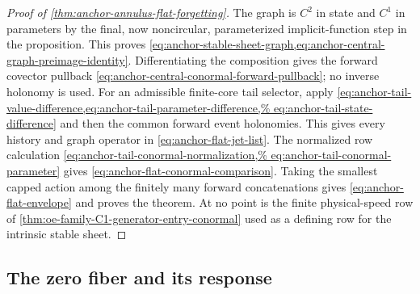 \begin{proof}[Proof of \cref{thm:anchor-annulus-flat-forgetting}]
The graph is \(C^2\) in state and \(C^1\) in parameters by the final,
now noncircular, parameterized implicit-function step in the proposition.
This proves
\cref{eq:anchor-stable-sheet-graph,eq:anchor-central-graph-preimage-identity}.
Differentiating the composition gives the forward covector pullback
\cref{eq:anchor-central-conormal-forward-pullback}; no inverse holonomy is
used.  For an admissible finite-core tail selector, apply
\cref{eq:anchor-tail-value-difference,eq:anchor-tail-parameter-difference,%
eq:anchor-tail-state-difference} and then the common forward event
holonomies.  This gives every history and graph operator in
\cref{eq:anchor-flat-jet-list}.  The normalized row calculation
\cref{eq:anchor-tail-conormal-normalization,%
eq:anchor-tail-conormal-parameter} gives
\cref{eq:anchor-flat-conormal-comparison}.  Taking the smallest capped
action among the finitely many forward concatenations gives
\cref{eq:anchor-flat-envelope} and proves the theorem.  At no point is the
finite physical-speed row of
\cref{thm:oe-family-C1-generator-entry-conormal} used as a defining row for
the intrinsic stable sheet.
\end{proof}

\subsection{The zero fiber and its response}

